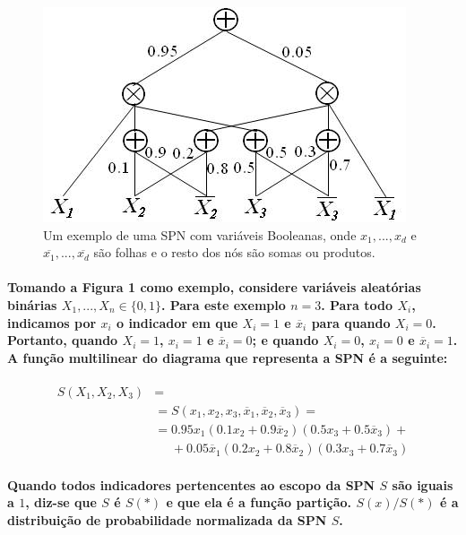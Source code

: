 \documentclass[a4paper,10pt]{article}
\theoremstyle{plain}
\begin{document}
\begin{figure}[h]
\centering\includegraphics[scale=0.7]{imgs/domingos_poon.jpg}
\caption{Um exemplo de uma SPN com variáveis Booleanas, onde $x_1,...,x_d$ e 
  $\overline{x_1},...,\overline{x_d}$ são folhas e o resto dos nós são somas ou produtos.\cite{poon-domingos}}
\end{figure}

\paragraph{
  Tomando a Figura 1 como exemplo, considere variáveis aleatórias binárias $X_1,...,X_n \in \{0,1\}$. Para este
exemplo $n=3$. Para todo $X_i$, indicamos por $x_i$ o indicador em que $X_i=1$ e $\overline{x}_i$ para quando
$X_i=0$. Portanto, quando $X_i=1$, $x_i=1$ e $\overline{x}_i=0$; e quando $X_i=0$, $x_i=0$ e $\overline{x}_i=1$.
A função multilinear do diagrama que representa a SPN é a seguinte:
} 

\begin{equation}
\begin{split}
S(X_1,X_2,X_3) & =\\
& =S(x_1,x_2,x_3,\overline{x}_1,\overline{x}_2,\overline{x}_3)=\\
& =0.95x_1(0.1x_2+0.9\overline{x}_2)(0.5x_3+0.5\overline{x}_3)+\\
&\phantom{=} +0.05\overline{x}_1(0.2x_2+0.8\overline{x}_2)(0.3x_3+0.7\overline{x}_3)
\end{split}
\end{equation}

\paragraph{
  Quando todos indicadores pertencentes ao escopo da SPN $S$ são iguais a $1$, diz-se que $S$ é
$S(*)$ e que ela é a função partição. $S(x)/S(*)$ é a distribuição de probabilidade normalizada da SPN $S$.
}
\end{document}
